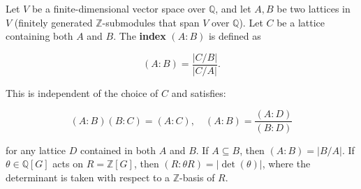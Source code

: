 Let $V$ be a finite-dimensional vector space over $\mathbb{Q}$, and let $A, B$ be two
lattices in $V$ (finitely generated $\mathbb{Z}$-submodules that span $V$ over $\mathbb{Q}$).
Let $C$ be a lattice containing both $A$ and $B$. The \textbf{index} $(A : B)$ is defined as

$$(A : B) = \frac{|C/B|}{|C/A|}.$$

This is independent of the choice of $C$ and satisfies:

$$(A : B)(B : C) = (A : C), \quad (A : B) = \frac{(A : D)}{(B : D)}$$

for any lattice $D$ contained in both $A$ and $B$. If $A \subseteq B$, then $(A : B) = |B/A|$.
If $\theta \in \mathbb{Q}[G]$ acts on $R = \mathbb{Z}[G]$, then $(R : \theta R) = |\det(\theta)|$,
where the determinant is taken with respect to a $\mathbb{Z}$-basis of $R$.
